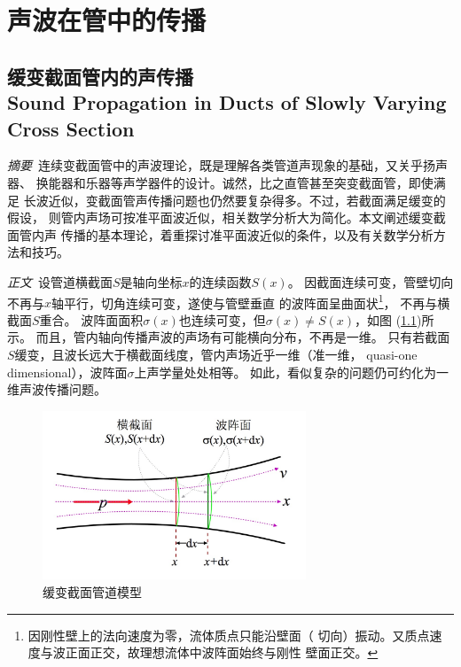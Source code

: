 \documentclass[UTF8]{ctexbook}
\let\stdsection\section
\renewcommand\section{\newpage\stdsection}
\begin{document}
\chapter{声波在管中的传播}

\section{缓变截面管内的声传播\\
Sound Propagation in Ducts of Slowly Varying Cross Section}

\emph{摘要}\ 
连续变截面管中的声波理论，既是理解各类管道声现象的基础，又关乎扬声器、
换能器和乐器等声学器件的设计。诚然，比之直管甚至突变截面管，即使满足
长波近似，变截面管声传播问题也仍然要复杂得多。不过，若截面满足缓变的假设，
则管内声场可按准平面波近似，相关数学分析大为简化。本文阐述缓变截面管内声
传播的基本理论，着重探讨准平面波近似的条件，以及有关数学分析方法和技巧。


\emph{正文}\
设管道横截面$S$是轴向坐标$x$的连续函数$S(x)$。
因截面连续可变，管壁切向不再与$x$轴平行，切角连续可变，遂使与管壁垂直
的波阵面呈曲面状\footnote{因刚性壁上的法向速度为零，流体质点只能沿壁面（
切向）振动。又质点速度与波正面正交，故理想流体中波阵面始终与刚性
壁面正交。}，
不再与横截面$S$重合。
波阵面面积$\sigma(x)$也连续可变，但$\sigma(x)\neq S(x)$，如图
(\ref{fig:slowvar_mod})所示。
而且，管内轴向传播声波的声场有可能横向分布，不再是一维。
只有若截面$S$缓变，且波长远大于横截面线度，管内声场近乎一维（准一维，
quasi-one dimensional），波阵面$\sigma$上声学量处处相等。
如此，看似复杂的问题仍可约化为一维声波传播问题。

\begin{figure}[h]
	\label{fig:slowvar_mod}
	\centering
	\includegraphics[width=0.7\textwidth]{img/duct/slowlyVaryingPipe.jpg}
	\caption{缓变截面管道模型}
\end{figure}
\end{document}
